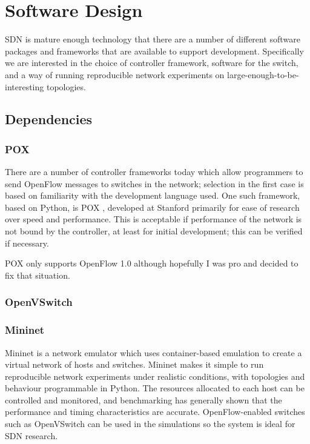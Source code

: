 \chapter{Software Design}

SDN is mature enough technology that there are a number of different software packages and frameworks that are available to support development. Specifically we are interested in the choice of controller framework, software for the switch, and a way of running reproducible network experiments on large-enough-to-be-interesting topologies.

\section{Dependencies}
\subsection{POX}
There are a number of controller frameworks today which allow programmers to send OpenFlow messages to switches in the network; selection in the first case is based on familiarity with the development language used. One such framework, based on Python, is POX \cite{onl:pox}, developed at Stanford primarily for ease of research over speed and performance. This is acceptable if performance of the network is not bound by the controller, at least for initial development; this can be verified if necessary.

POX only supports OpenFlow 1.0 although hopefully I was pro and decided to fix that situation.

\subsection{OpenVSwitch}

\subsection{Mininet}
Mininet is a network emulator which uses container-based emulation \cite{handigol:mininet} to create a virtual network of hosts and switches. Mininet makes it simple to run reproducible network experiments under realistic conditions, with topologies and behaviour programmable in Python. The resources allocated to each host can be controlled and monitored, and benchmarking \cite{handigol:benchmarks} has generally shown that the performance and timing characteristics are accurate. OpenFlow-enabled switches such as OpenVSwitch can be used in the simulations so the system is ideal for SDN research.

